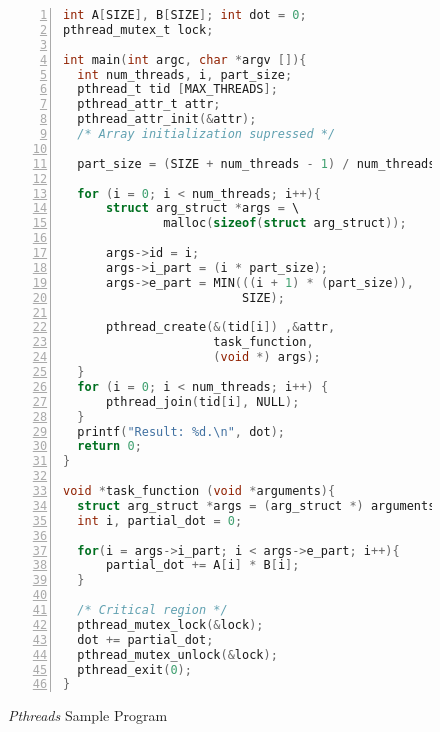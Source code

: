 \begin{figure}[htb]
\begin{minipage}{\linewidth}
\begin{lstlisting}[language=C, basicstyle=\ttfamily\scriptsize, numbers=left,
                   frame=no, showspaces=false, showstringspaces=false,
                   numberstyle=\tiny,
                   xleftmargin=0.5cm, frame=trBL,
                   keywords={%
                       DATATYPE, pthread_t, pthread_create,
                       pthread_join, task_function, NULL, int, main,
                       void, printf, return, pthread_mutex_t,
                       pthread_attr_t, pthread_attr_init,
                       MAX_THREADS, SIZE, char, struct, malloc,
                       MIN, pthread_mutex_lock, pthread_mutex_unlock,
                       pthread_exit%
                       },
                   otherkeywords={::, \#pragma, \#include, <<<,>>>, \&, \*, +, -, /, [, ], >, <}
                   ]
int A[SIZE], B[SIZE]; int dot = 0;
pthread_mutex_t lock;

int main(int argc, char *argv []){
  int num_threads, i, part_size;
  pthread_t tid [MAX_THREADS];
  pthread_attr_t attr;
  pthread_attr_init(&attr);
  /* Array initialization supressed */

  part_size = (SIZE + num_threads - 1) / num_threads;

  for (i = 0; i < num_threads; i++){
      struct arg_struct *args = \
              malloc(sizeof(struct arg_struct));

      args->id = i;
      args->i_part = (i * part_size);
      args->e_part = MIN(((i + 1) * (part_size)),
                         SIZE);

      pthread_create(&(tid[i]) ,&attr,
                     task_function,
                     (void *) args);
  }
  for (i = 0; i < num_threads; i++) {
      pthread_join(tid[i], NULL);
  }
  printf("Result: %d.\n", dot);
  return 0;
}

void *task_function (void *arguments){
  struct arg_struct *args = (arg_struct *) arguments;
  int i, partial_dot = 0;

  for(i = args->i_part; i < args->e_part; i++){
      partial_dot += A[i] * B[i];
  }

  /* Critical region */
  pthread_mutex_lock(&lock);
  dot += partial_dot;
  pthread_mutex_unlock(&lock);
  pthread_exit(0);
}
\end{lstlisting}
\end{minipage}
\caption{\textit{Pthreads} Sample Program}
\label{lst:pthreads}
\end{figure}

